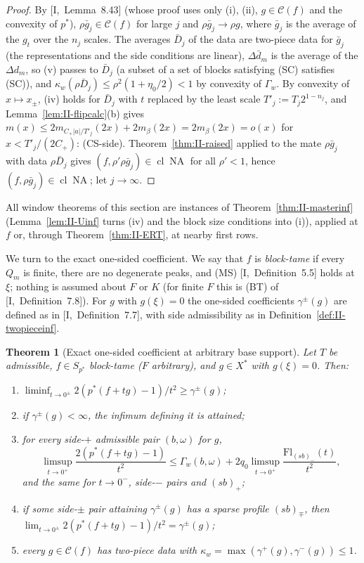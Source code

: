\documentclass[10pt]{amsart}
\newtheorem{theorem}{Theorem}[section]
\theoremstyle{definition}
\theoremstyle{remark}
\newcommand{\NA}{\operatorname{NA}}
\newcommand{\Cset}{\mathcal C}
\newcommand{\cl}{\operatorname{cl}}
\begin{document}
\begin{proof}
By [I,~Lemma~8.43] (whose proof uses only (i), (ii), $g\in\Cset(f)$ and the
convexity of $p^*$), $\rho\bar g_j\in\Cset(f)$ for large $j$ and $\rho\bar
g_j\to\rho g$, where $\bar g_j$ is the average of the $g_t$ over the $n_j$
scales.  The averages $\bar D_j$ of the data are two-piece data for $\bar
g_j$ (the representations and the side conditions are linear), $\Delta\bar
d_m$ is the average of the $\Delta d_m$, so (v) passes to $\bar D_j$ (a subset
of a set of blocks satisfying (SC) satisfies (SC)), and $\kappa_w(\rho\bar
D_j)\le\rho^2(1+\eta_0/2)<1$ by convexity of $\Gamma_w$.  By convexity of
$x\mapsto x_\pm$, (iv) holds for $\bar D_j$ with $t$ replaced by the least
scale $T'_j:=T_j2^{1-n_j}$, and Lemma~\ref{lem:II-flipcalc}(b) gives
$m(x)\le2m_{C_+|a|/T'_j}(2x)+2m_\beta(2x)=2m_\beta(2x)=o(x)$ for
$x<T'_j/(2C_+)$: (CS-side).  Theorem~\ref{thm:II-raised} applied to the mate
$\rho\bar g_j$ with data $\rho\bar D_j$ gives $(f,\rho'\rho\bar g_j)\in\cl\NA$
for all $\rho'<1$, hence $(f,\rho\bar g_j)\in\cl\NA$; let $j\to\infty$.
\end{proof}

All window theorems of this section are instances of
Theorem~\ref{thm:II-masterinf} (Lemma~\ref{lem:II-Uinf} turns (iv) and the
block size conditions into (i)), applied at $f$ or, through
Theorem~\ref{thm:II-ERT}, at nearby first rows.

\smallskip
We turn to the exact one-sided coefficient.  We say that $f$ is
\emph{block-tame} if every $Q_m$ is finite, there are no degenerate peaks,
and (MS) [I,~Definition~5.5] holds at $\xi$; nothing is assumed about $F$ or
$K$ (for finite $F$ this is (BT) of [I,~Definition~7.8]).  For $g$ with
$g(\xi)=0$ the one-sided coefficients $\gamma^\pm(g)$ are defined as in
[I,~Definition~7.7], with side admissibility as in
Definition~\ref{def:II-twopieceinf}.

\begin{theorem}[Exact one-sided coefficient at arbitrary base support]
\label{thm:II-onesidedinf}
Let $T$ be admissible, $f\in S_{p^*}$ block-tame \textup{(}$F$
arbitrary\textup{)}, and $g\in X^*$ with $g(\xi)=0$.  Then:
\begin{enumerate}
\item[(a)] $\liminf_{t\to0^\pm}2(p^*(f+tg)-1)/t^2\ge\gamma^\pm(g)$;
\item[(b)] if $\gamma^\pm(g)<\infty$, the infimum defining it is attained;
\item[(c)] for every side-$+$ admissible pair $(b,\omega)$ for $g$,
\[
 \limsup_{t\to0^+}\frac{2(p^*(f+tg)-1)}{t^2}\le\Gamma_w(b,\omega)+2q_0
 \limsup_{t\to0^+}\frac{\mathrm{Fl}_{(sb)_-}(t)}{t^2},
\]
and the same for $t\to0^-$, side-$-$ pairs and $(sb)_+$;
\item[(d)] if some side-$\pm$ pair attaining $\gamma^\pm(g)$ has a sparse
profile $(sb)_\mp$, then $\lim_{t\to0^\pm}2(p^*(f+tg)-1)/t^2=\gamma^\pm(g)$;
\item[(e)] every $g\in\Cset(f)$ has two-piece data with
$\kappa_w=\max(\gamma^+(g),\gamma^-(g))\le1$.
\end{enumerate}
\end{theorem}
\end{document}

